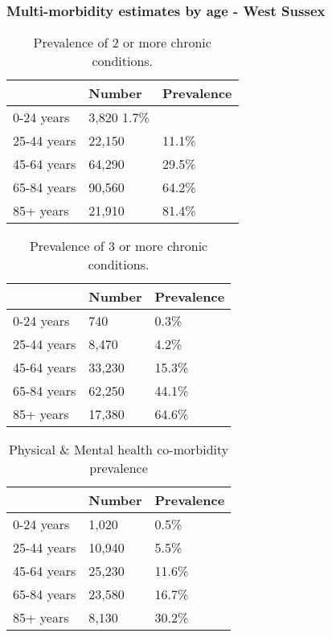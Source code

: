\subsubsection{Multi-morbidity estimates by age - West Sussex}
\begin{table}
    \caption{Prevalence of 2 or more chronic conditions.}
    \centering
    \begin{tabular}{lll}
        \toprule
        \ & Number & Prevalence \\
        \midrule
        0-24 years & 3,820 1.7\% \\
        25-44 years & 22,150 & 11.1\% \\
        45-64 years & 64,290 & 29.5\% \\
        65-84 years & 90,560 & 64.2\% \\
        85+ years & 21,910 & 81.4\% \\
        \bottomrule
    \end{tabular}
    \label{tab:op:2_plus_conds}
\end{table}

\begin{table}
    \caption{Prevalence of 3 or more chronic conditions.}
    \centering
    \begin{tabular}{lll}
        \toprule
        \ & Number & Prevalence \\
        \midrule
        0-24 years & 740 & 0.3\% \\
        25-44 years & 8,470 & 4.2\% \\
        45-64 years & 33,230 & 15.3\% \\
        65-84 years & 62,250 & 44.1\% \\
        85+ years & 17,380 & 64.6\% \\
        \bottomrule
    \end{tabular}
    \label{tab:op:3_plus_conds}
\end{table}

\begin{table}
    \caption{Physical \& Mental health co-morbidity prevalence}
    \centering
    \begin{tabular}{lll}
        \toprule
        \ & Number & Prevalence \\
        \midrule
        0-24 years & 1,020 & 0.5\% \\
        25-44 years & 10,940 & 5.5\% \\
        45-64 years & 25,230 & 11.6\% \\
        65-84 years & 23,580 & 16.7\% \\
        85+ years & 8,130 & 30.2\% \\
        \bottomrule
    \end{tabular}
    \label{tab:op:m_and_p}
\end{table}

